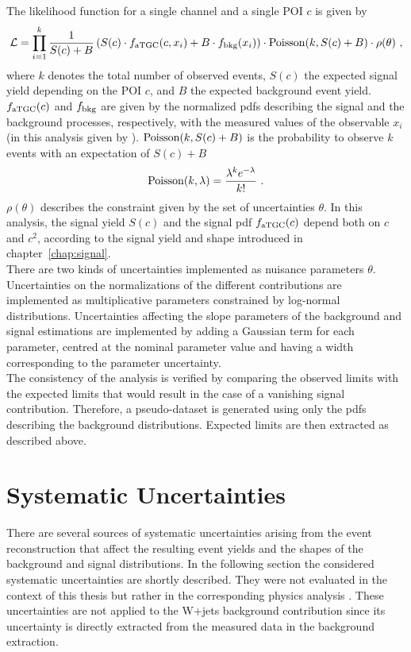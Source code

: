 \noindent The likelihood function for a single channel and a single POI $c$ is given by
\begin{equation}
\mathcal{L} = \prod_{i=1}^k  \frac{1}{S(c)+B} \left(S(c)\cdot f_{\rm aTGC}(c,x_i) + B\cdot f_{\rm bkg}(x_i) 	\right) \cdot {\rm Poisson}(k,S(c)+B) \cdot \rho(\theta)~,
\end{equation}
where $k$ denotes the total number of observed events, $S(c)$ the expected signal yield depending on the POI $c$, and $B$ the expected background event yield. $f_{\rm aTGC}(c)$ and $f_{\rm bkg}$ are given by the normalized pdfs describing the signal and the background processes, respectively, with the measured values of the observable $x_i$ (in this analysis given by \MWV). ${\rm Poisson}(k,S(c)+B)$ is the probability to observe $k$ events with an expectation of $S(c)+B$
\begin{equation}
{\rm Poisson}(k,\lambda) = \frac{\lambda^k e^{-\lambda}}{k!} ~.
\end{equation}
$\rho(\theta)$ describes the constraint given by the set of uncertainties $\theta$. In this analysis, the signal yield $S(c)$ and the signal pdf $f_{\rm aTGC}(c)$ depend both on $c$ and $c^2$, according to the signal yield and shape introduced in chapter~\ref{chap:signal}.\\

\noindent There are two kinds of uncertainties implemented as nuisance parameters $\theta$. Uncertainties on the normalizations of the different contributions are implemented as multiplicative parameters constrained by log-normal distributions. Uncertainties affecting the slope parameters of the background and signal estimations are implemented by adding a Gaussian term for each parameter, centred at the nominal parameter value and having a width corresponding to the parameter uncertainty.\\

\noindent The consistency of the analysis is verified by comparing the observed limits with the expected limits that would result in the case of a vanishing signal contribution. Therefore, a pseudo-dataset is generated using only the pdfs describing the background distributions. Expected limits are then extracted as described above.


\section{Systematic Uncertainties}
\label{sec:systematics}
There are several sources of systematic uncertainties arising from the event reconstruction that affect the resulting event yields and the shapes of the background and signal distributions. In the following section the considered systematic uncertainties are shortly described. They were not evaluated in the context of this thesis but rather in the corresponding physics analysis \cite{PAS}. These uncertainties are not applied to the W+jets background contribution since its uncertainty is directly extracted from the measured data in the background extraction.

